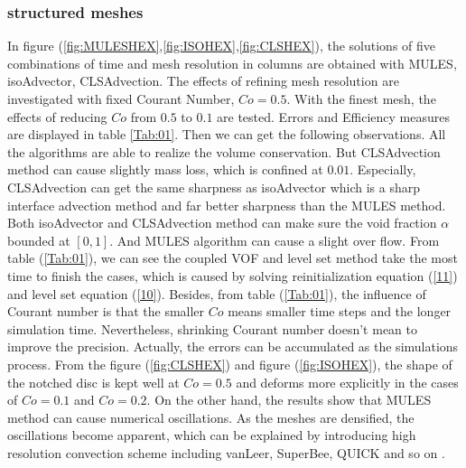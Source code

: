 \subsubsection{structured meshes}
In figure (\ref{fig:MULESHEX},\ref{fig:ISOHEX},\ref{fig:CLSHEX}), the solutions of five combinations of time and mesh resolution in columns are obtained with MULES, isoAdvector, CLSAdvection. The effects of refining mesh resolution are investigated with fixed Courant Number, $Co=0.5$. With the finest mesh, the effects of reducing $Co$ from $0.5$ to $0.1$ are tested. Errors and Efficiency measures are displayed in table \ref{Tab:01}. Then we can get the following observations. All the algorithms are able to realize the volume conservation. But CLSAdvection method can cause slightly mass loss, which is confined at $0.01$. Especially, CLSAdvection can get the same sharpness as isoAdvector which is a sharp interface advection method and far better sharpness than the MULES method. Both isoAdvector and CLSAdvection method can make sure the void fraction $\alpha$ bounded at $[0,1]$. And MULES algorithm can cause a slight over flow. From table (\ref{Tab:01}), we can see the coupled VOF and level set method take the most time to finish the cases, which is caused by solving reinitialization equation (\ref{11}) and level set equation (\ref{10}). Besides, from table (\ref{Tab:01}), the influence of Courant number is that the smaller $Co$ means smaller time steps and the longer simulation time. Nevertheless, shrinking Courant number doesn't mean to improve the precision. Actually, the errors can be accumulated as the simulations process. From the figure (\ref{fig:CLSHEX}) and figure (\ref{fig:ISOHEX}), the shape of the notched disc is kept well at $Co=0.5$ and deforms more explicitly in the cases of $Co = 0.1$ and $Co = 0.2$. On the other hand, the results show that MULES method can cause numerical oscillations. As the meshes are densified, the oscillations become apparent, which can be explained by introducing high resolution convection scheme including vanLeer, SuperBee, QUICK and so on \cite{deshpande2012evaluating}.

